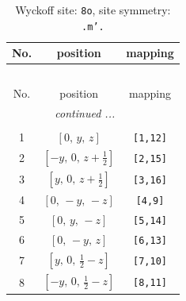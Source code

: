 \documentclass[fleqn,8pt]{jsarticle}
\begin{document}
\renewcommand{\arraystretch}{1.2}
\begin{longtable}{ccc}
\caption{Wyckoff site: {\tt 8o}, site symmetry: {\tt .m'.}}
 \\
 \hline \hline
No. & position & mapping \\ \hline \endfirsthead

\multicolumn{2}{l}{\tablename\ \thetable{}} \\
 \hline \hline
No. & position & mapping \\ \hline \endhead

 \hline \hline
\multicolumn{2}{r}{\footnotesize\it continued ...} \\ \endfoot

 \hline \hline
\multicolumn{2}{r}{} \\ \endlastfoot

1 & $\left[ 0,\, y,\, z \right]$ & {\tt [1,12]} \\ \hline
2 & $\left[ - y,\, 0,\, z + \frac{1}{2} \right]$ & {\tt [2,15]} \\ \hline
3 & $\left[ y,\, 0,\, z + \frac{1}{2} \right]$ & {\tt [3,16]} \\ \hline
4 & $\left[ 0,\, - y,\, - z \right]$ & {\tt [4,9]} \\ \hline
5 & $\left[ 0,\, y,\, - z \right]$ & {\tt [5,14]} \\ \hline
6 & $\left[ 0,\, - y,\, z \right]$ & {\tt [6,13]} \\ \hline
7 & $\left[ y,\, 0,\, \frac{1}{2} - z \right]$ & {\tt [7,10]} \\ \hline
8 & $\left[ - y,\, 0,\, \frac{1}{2} - z \right]$ & {\tt [8,11]} \\
\end{longtable}
\renewcommand{\arraystretch}{1.2}
\end{document}
